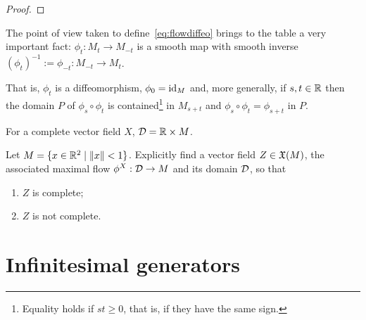 \begin{proof}

\end{proof}

\begin{remark}\label{rmk:automorphismgroup}
	The point of view taken to define~\eqref{eq:flowdiffeo} brings to the table a very important fact: $\phi_t : M_t \to M_{-t}$ is a smooth map with smooth inverse $(\phi_t)^{-1}:=\phi_{-t}: M_{-t} \to M_t$.

	That is, $\phi_t$ is a diffeomorphism, $\phi_0 = \operatorname{id}_M$ and, more generally, if $s,t \in \mathbb{R}$ then the domain $P$ of $\phi_s \circ \phi_t$ is contained\footnote{Equality holds if $st \geq 0$, that is, if they have the same sign.} in $M_{s+t}$ and $\phi_s \circ \phi_t = \phi_{s+t}$ in $P$.
\end{remark}

For a complete vector field $X$, $\mathcal{D} = \mathbb{R}\times M$.

\begin{exercise}
	Let $M = \{x\in\mathbb{R}^2 \mid \|x\|<1\}$. Explicitly find a vector field $Z\in\mathfrak{X}(M)$, the associated maximal flow $\phi^X: \mathcal{D} \to M$ and its domain $\mathcal{D}$, so that
	\begin{enumerate}
		\item $Z$ is complete;
		\item $Z$ is not complete.
	\end{enumerate}
\end{exercise}

\section{Infinitesimal generators}

